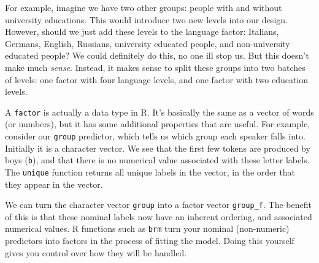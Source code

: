 \documentclass[
]{book}
\newenvironment{Shaded}{\begin{snugshade}}{\end{snugshade}}
\newcommand{\CommentTok}[1]{\textcolor[rgb]{0.56,0.35,0.01}{\textit{#1}}}
\newcommand{\DocumentationTok}[1]{\textcolor[rgb]{0.56,0.35,0.01}{\textbf{\textit{#1}}}}
\newcommand{\FunctionTok}[1]{\textcolor[rgb]{0.00,0.00,0.00}{#1}}
\newcommand{\NormalTok}[1]{#1}
\newcommand{\SpecialCharTok}[1]{\textcolor[rgb]{0.00,0.00,0.00}{#1}}
\begin{document}
For example, imagine we have two other groups: people with and without university educations. This would introduce two new levels into our design. However, should we just add these levels to the language factor: Italians, Germans, English, Russians, university educated people, and non-university educated people? We could definitely do this, no one ill stop us. But this doesn't make much \emph{sense}. Instead, it makes sense to split these groups into two batches of levels: one factor with four language levels, and one factor with two education levels.

A \texttt{factor} is actually a data type in R. It's basically the same as a vector of words (or numbers), but it has some additional properties that are useful. For example, consider our \texttt{group} predictor, which tells us which group each speaker falls into. Initially it is a character vector. We see that the first few tokens are produced by boys (\texttt{b}), and that there is no numerical value associated with these letter labels. The \texttt{unique} function returns all unique labels in the vector, in the order that they appear in the vector.

\begin{Shaded}
\end{Shaded}

We can turn the character vector \texttt{group} into a factor vector \texttt{group\_f}. The benefit of this is that these nominal labels now have an inherent ordering, and associated numerical values. R functions such as \texttt{brm} turn your nominal (non-numeric) predictors into factors in the process of fitting the model. Doing this yourself gives you control over how they will be handled.
\end{document}

